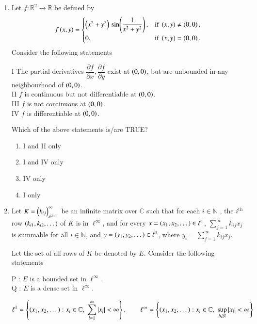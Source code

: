 \documentclass[journal,12pt,onecolumn]{IEEEtran}
\theoremstyle{remark}
\begin{document}
\begin{enumerate}[start=1, label=Q.\arabic*]
\hfill{}

\item Let $f : \mathbb{R}^2 \to \mathbb{R}$ be defined by
\[
f\left(x,y\right) =
\begin{cases}
\left(x^2+y^2\right)\,\sin\!\left(\dfrac{1}{x^2+y^2}\right), & \text{if } \left(x,y\right) \ne \left(0,0\right),\\[6pt]
0, & \text{if } \left(x,y\right)=\left(0,0\right).
\end{cases}
\]
Consider the following statements\brak{:}

I  The partial derivatives $\dfrac{\partial f}{\partial x}, \dfrac{\partial f}{\partial y}$ exist at $\left(0,0\right)$, but are unbounded in any neighbourhood of $\left(0,0\right)$.\\
II  $f$ is continuous but not differentiable at $\left(0,0\right)$.\\
III  $f$ is not continuous at $\left(0,0\right)$.\\
IV  $f$ is differentiable at $\left(0,0\right)$.\\


Which of the above statements is/are TRUE?
\begin{enumerate}
\item I and II only
\item I and IV only
\item IV only
\item I only
\end{enumerate}

\hfill{}
\item Let $K=\left(k_{ij}\right)_{j,i=1}^{\infty}$ be an infinite matrix over $\mathbb{C}$  such that  
 for each $i \in \mathbb{N}$ , the $i^{\text{th}}$ row $\left(k_{i1},k_{i2},\dots\right)$ of $K$ is in $\ell^{\infty}$, and  
 for every $x=\left(x_1,x_2,\dots\right) \in \ell^1$, $\sum_{j=1}^{\infty} k_{ij} x_j$ is summable for all $i \in \mathbb{N}$, and $y=\left(y_1,y_2,\dots\right) \in \ell^1$, where $y_i=\sum_{j=1}^{\infty} k_{ij} x_j$.  

Let the set of all rows of $K$ be denoted by $E$. Consider the following statements\brak{:}

P : $E$ is a bounded set in $\ell^{\infty}$.\\
Q : $E$ is a dense set in $\ell^{\infty}$.

\[
\ell^{1}=\left\{ \left(x_1,x_2,\dots\right) : x_i \in \mathbb{C},\; \sum_{i=1}^{\infty} \left\vert x_i\right\vert < \infty \right\}, \qquad
\ell^{\infty}=\left\{ \left(x_1,x_2,\dots\right) : x_i \in \mathbb{C},\; \sup_{i \in \mathbb{N}} \left\vert x_i\right\vert < \infty \right\}
\]


\end{enumerate}
\end{document}
